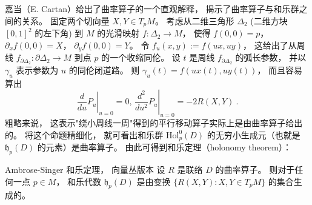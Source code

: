 嘉当（E. Cartan）给出了曲率算子的一个直观解释， 揭示了曲率算子与和乐群之间的关系。 固定两个切向量 $X,Y\in T_pM$。 考虑从二维三角形 $\Delta_2$ (二维方块 $[0,1]^2$ 的左下角) 到 $M$ 的光滑映射 $f:\Delta_2\to M$， 使得 $f(0,0)=p$， $\partial_xf(0,0)=X$， $\partial_yf(0,0)=Y$。 令 $f_u(x,y):=f(ux,uy)$， 这给出了从周线 $f_{\partial\Delta_2}:\partial\Delta_2\to M$ 到点 $p$ 的一个收缩同伦。 设 $t$ 是周线 $f_{\partial\Delta_2}$ 的弧长参数， 并以 $\gamma_u$ 表示参数为 $u$ 的同伦闭道路。 则 $\gamma_u(t)=f(ux(t),uy(t))$， 而且容易算出
$$
\left.\frac{d}{du}P_u\right|_{u=0}=0,\,\left.\frac{d^2}{du^2}P_u\right|_{u=0}=-2R(X,Y)~.
$$
粗略来说， 这表示"绕小周线一周"得到的平行移动算子实际上是由曲率算子给出的。 将这个命题精细化， 就可看出和乐群 $\text{Hol}_p^0(D)$ 的无穷小生成元（也就是 $\mathfrak{h}_p(D)$ 的元素）是曲率算子。 由此可得到和乐定理（holonomy theorem）：

\begin{theorem}{Ambrose-Singer 和乐定理， 向量丛版本}
设 $R$ 是联络 $D$ 的曲率算子。 则对于任何一点 $p\in M$， 和乐代数 $\mathfrak{h}_p(D)$ 是由变换 $\{R(X,Y):X,Y\in T_pM\}$ 的集合生成的。
\end{theorem}
